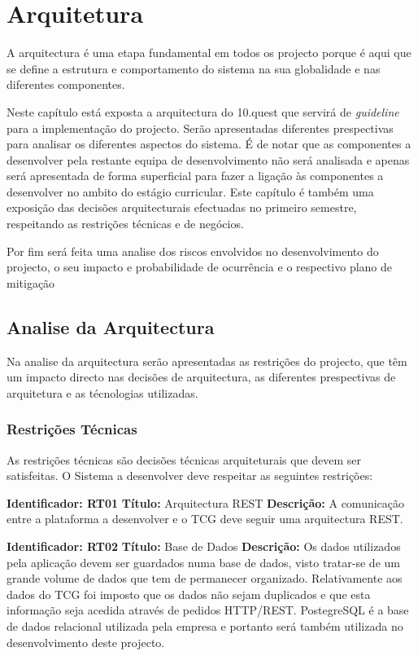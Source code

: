 
\chapter{Arquitetura}
\label{sec:arquitetura}

A arquitectura é uma etapa fundamental em todos os projecto porque é aqui que se define a estrutura e comportamento do sistema na sua globalidade e nas diferentes componentes.

Neste capítulo está exposta a arquitectura do 10.quest que servirá de \textit{guideline} para a implementação do projecto. Serão apresentadas diferentes prespectivas para analisar os diferentes aspectos do sistema. É de notar que as componentes a desenvolver pela restante equipa de desenvolvimento não será analisada e apenas será apresentada de forma superficial para fazer a ligação às componentes a desenvolver no ambito do estágio curricular.
Este capítulo é também uma exposição das decisões arquitecturais efectuadas no primeiro semestre, respeitando as restrições técnicas e de negócios.

Por fim será feita uma analise dos riscos envolvidos no desenvolvimento do projecto, o seu impacto e probabilidade de ocurrência e o respectivo plano de mitigação




\section{Analise da Arquitectura}
\label{analisearq}

Na analise da arquitectura serão apresentadas as restrições do projecto, que têm um impacto directo nas decisões de arquitectura, as diferentes prespectivas de arquitetura e as técnologias utilizadas.

\subsection{Restrições Técnicas}
As restrições técnicas são decisões técnicas arquiteturais que devem ser satisfeitas. O Sistema a desenvolver deve respeitar as seguintes restrições:

\textbf{Identificador: RT01}
\newline
\textbf{Título:} Arquitectura REST
\newline
\textbf{Descrição:} A comunicação entre a plataforma a desenvolver e o TCG deve seguir uma arquitectura REST.

\textbf{Identificador: RT02}
\newline
\textbf{Título:} Base de Dados
\newline
\textbf{Descrição:} Os dados utilizados pela aplicação devem ser guardados numa base de dados, visto tratar-se de um grande volume de dados que tem de permanecer organizado. Relativamente aos dados do TCG foi imposto que os dados não sejam duplicados e que esta informação seja acedida através de pedidos HTTP/REST. PostegreSQL\cite{sql} é a base de dados relacional utilizada pela empresa e portanto será também utilizada no desenvolvimento deste projecto.

